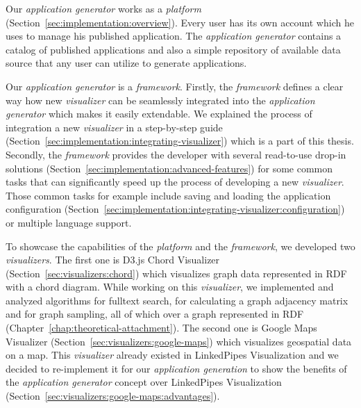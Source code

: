 Our \emph{application generator} works as a \emph{platform} (Section~\ref{sec:implementation:overview}). Every user has its own account which he uses to manage his published application. The \emph{application generator} contains a catalog of published applications and also a simple repository of available data source that any user can utilize to generate applications.

Our \emph{application generator} is a \emph{framework}. Firstly, the \emph{framework} defines a clear way how new \emph{visualizer} can be seamlessly integrated into the \emph{application generator} which makes it easily extendable. We explained the process of integration a new \emph{visualizer} in a step-by-step guide (Section~\ref{sec:implementation:integrating-visualizer}) which is a part of this thesis. Secondly, the \emph{framework} provides the developer with several read-to-use drop-in solutions (Section~\ref{sec:implementation:advanced-features}) for some common tasks that can significantly speed up the process of developing a new \emph{visualizer}. Those common tasks for example include saving and loading the application configuration (Section~\ref{sec:implementation:integrating-visualizer:configuration}) or multiple language support.

To showcase the capabilities of the \emph{platform} and the \emph{framework}, we developed two \emph{visualizers}. The first one is D3.js Chord Visualizer (Section~\ref{sec:visualizers:chord}) which visualizes graph data represented in RDF with a chord diagram. While working on this \emph{visualizer}, we implemented and analyzed algorithms for fulltext search, for calculating a graph adjacency matrix and for graph sampling, all of which over a graph represented in RDF (Chapter~\ref{chap:theoretical-attachment}). The second one is Google Maps Visualizer (Section~\ref{sec:visualizers:google-maps}) which visualizes geospatial data on a map. This \emph{visualizer} already existed in LinkedPipes Visualization and we decided to re-implement it for our \emph{application generation} to show the benefits of the \emph{application generator} concept over LinkedPipes Visualization (Section~\ref{sec:visualizers:google-maps:advantages}).

